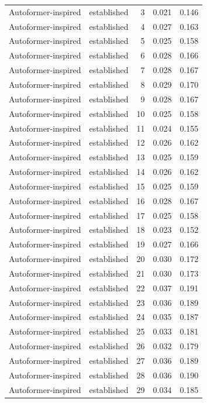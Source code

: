 \begin{tabular}{llrrr}
Autoformer-inspired & established & 3 & 0.021 & 0.146 \\
Autoformer-inspired & established & 4 & 0.027 & 0.163 \\
Autoformer-inspired & established & 5 & 0.025 & 0.158 \\
Autoformer-inspired & established & 6 & 0.028 & 0.166 \\
Autoformer-inspired & established & 7 & 0.028 & 0.167 \\
Autoformer-inspired & established & 8 & 0.029 & 0.170 \\
Autoformer-inspired & established & 9 & 0.028 & 0.167 \\
Autoformer-inspired & established & 10 & 0.025 & 0.158 \\
Autoformer-inspired & established & 11 & 0.024 & 0.155 \\
Autoformer-inspired & established & 12 & 0.026 & 0.162 \\
Autoformer-inspired & established & 13 & 0.025 & 0.159 \\
Autoformer-inspired & established & 14 & 0.026 & 0.162 \\
Autoformer-inspired & established & 15 & 0.025 & 0.159 \\
Autoformer-inspired & established & 16 & 0.028 & 0.167 \\
Autoformer-inspired & established & 17 & 0.025 & 0.158 \\
Autoformer-inspired & established & 18 & 0.023 & 0.152 \\
Autoformer-inspired & established & 19 & 0.027 & 0.166 \\
Autoformer-inspired & established & 20 & 0.030 & 0.172 \\
Autoformer-inspired & established & 21 & 0.030 & 0.173 \\
Autoformer-inspired & established & 22 & 0.037 & 0.191 \\
Autoformer-inspired & established & 23 & 0.036 & 0.189 \\
Autoformer-inspired & established & 24 & 0.035 & 0.187 \\
Autoformer-inspired & established & 25 & 0.033 & 0.181 \\
Autoformer-inspired & established & 26 & 0.032 & 0.179 \\
Autoformer-inspired & established & 27 & 0.036 & 0.189 \\
Autoformer-inspired & established & 28 & 0.036 & 0.190 \\
Autoformer-inspired & established & 29 & 0.034 & 0.185 \\

\end{tabular}
